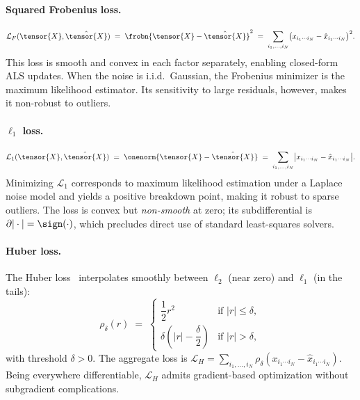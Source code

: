 \paragraph{Squared Frobenius loss.}
\begin{equation}
  \mathcal{L}_F(\tensor{X}, \hat{\tensor{X}})
  \;=\; \frobn{\tensor{X} - \hat{\tensor{X}}}^2
  \;=\; \sum_{i_1, \ldots, i_N}
        \bigl(x_{i_1\cdots i_N} - \hat{x}_{i_1\cdots i_N}\bigr)^2.
  \label{eq:loss_frobenius}
\end{equation}
This loss is smooth and convex in each factor separately,
enabling closed-form ALS updates.
When the noise is i.i.d.\ Gaussian, the Frobenius minimizer is the
maximum likelihood estimator.
Its sensitivity to large residuals, however, makes it non-robust to outliers.

\paragraph{$\ell_1$ loss.}
\begin{equation}
  \mathcal{L}_1(\tensor{X}, \hat{\tensor{X}})
  \;=\; \onenorm{\tensor{X} - \hat{\tensor{X}}}
  \;=\; \sum_{i_1, \ldots, i_N}
        \bigl|x_{i_1\cdots i_N} - \hat{x}_{i_1\cdots i_N}\bigr|.
  \label{eq:loss_l1}
\end{equation}
Minimizing $\mathcal{L}_1$ corresponds to maximum likelihood estimation
under a Laplace noise model and yields a positive breakdown point,
making it robust to sparse outliers.
The loss is convex but \emph{non-smooth} at zero; its subdifferential is
$\partial|\cdot| = \sign(\cdot)$, which precludes direct use of
standard least-squares solvers.

\paragraph{Huber loss.}
The Huber loss~\cite{huber1964robust} interpolates smoothly between
$\ell_2$ (near zero) and $\ell_1$ (in the tails):
\begin{equation}
  \rho_\delta(r)
  \;=\; \begin{cases}
          \dfrac{1}{2} r^2
            & \text{if } |r| \leq \delta, \\[8pt]
          \delta \!\left(|r| - \dfrac{\delta}{2}\right)
            & \text{if } |r| > \delta,
        \end{cases}
  \label{eq:huber}
\end{equation}
with threshold $\delta > 0$.
The aggregate loss is
$\mathcal{L}_H = \sum_{i_1,\ldots,i_N} \rho_\delta(x_{i_1\cdots i_N}
- \hat{x}_{i_1\cdots i_N})$.
Being everywhere differentiable, $\mathcal{L}_H$ admits gradient-based
optimization without subgradient complications.

